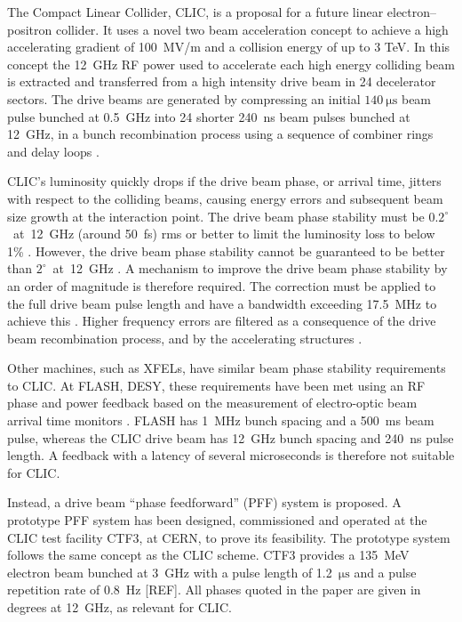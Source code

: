 \documentclass[%
 reprint,
superscriptaddress,
 amsmath,amssymb,
 prl,
]{revtex4-1}
\begin{document}
The Compact Linear Collider, CLIC, \cite{CLICCDR} is a proposal for a future 
linear electron--positron collider. It uses a novel two beam acceleration 
concept to achieve a high accelerating gradient of 100~MV/m 
and a collision energy of up to 3 TeV. In this concept the 12~GHz RF power used 
to accelerate each high energy colliding beam is extracted and transferred from 
a high intensity drive beam in 24 decelerator sectors. The 
drive beams are generated by compressing an initial 
\(140~\mathrm{\mu s}\) beam pulse bunched at 0.5~GHz into 24 shorter 240~ns 
beam pulses bunched at 12~GHz, in a bunch recombination process using a 
sequence of combiner rings and delay loops \cite{CLICCDR}.

CLIC's luminosity quickly drops if the drive beam phase, or arrival time, 
jitters with respect to the colliding beams, causing energy errors and 
subsequent beam size growth at the interaction point. The drive beam phase 
stability must be \(0.2^\circ\)~at~12~GHz (around 50~fs) rms or better to limit 
the luminosity loss to below 1\% \cite{CLICCDR}.  However, the drive beam phase 
stability cannot be guaranteed to be better than \(2^\circ\)~at~12~GHz 
\cite{CLICCDR}. A 
mechanism to improve the drive beam phase stability by an order of magnitude is 
therefore required. The correction must be applied to the full drive beam pulse 
length and have a bandwidth exceeding 17.5~MHz to achieve this 
\cite{Gerber2015}. Higher frequency errors are filtered as a consequence of the 
drive beam recombination process, and by the accelerating structures 
\cite{Gerber2015}.

Other machines, such as XFELs, have similar beam phase stability 	
requirements to CLIC. At FLASH, DESY, these requirements have been met using 
an RF phase and power feedback based on the measurement of electro-optic beam 
arrival time monitors \cite{flashPRL}. 
FLASH has 1~MHz bunch spacing and a 
500~ms beam pulse, whereas the CLIC drive beam has 12~GHz bunch spacing and 
240~ns pulse length. A feedback with a latency of several microseconds is 
therefore not suitable for CLIC.

Instead, a drive beam ``phase feedforward'' (PFF) 
system is proposed. A prototype PFF system has been designed, commissioned and 
operated at 
the CLIC test facility CTF3, at CERN, to prove its feasibility. The prototype 
system follows the same concept as the CLIC scheme. CTF3 provides a 135~MeV 
electron beam bunched at 3~GHz with a 
pulse length of 1.2~\(\mathrm{\mu s}\) and a pulse repetition rate of 0.8~Hz 
[REF]. All phases quoted in the paper are given in degrees at 12~GHz, as 
relevant for CLIC.
\end{document}
